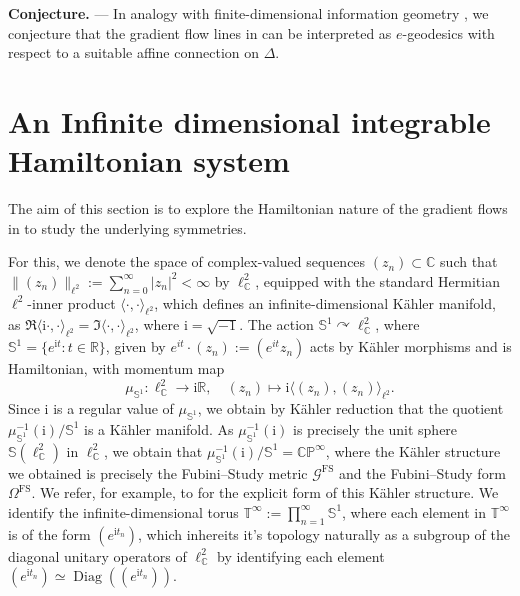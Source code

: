 \documentclass[runningheads]{llncs}
\def\S{\mathbb{S}}
\def\RR{\mathbb{R}}
\def\CC{\mathbb{C}}
\def\i{\mathrm{i}}
\begin{document}
\textbf{Conjecture.} — In analogy with finite-dimensional information geometry \cite{MR1800071,InfGeo_book}, we conjecture that the gradient flow lines in  can be interpreted as $e$-geodesics with respect to a suitable affine connection on \( \Delta \).

\section{An Infinite dimensional integrable Hamiltonian system}\label{S: 4}
The aim of this section is to explore the Hamiltonian nature of the gradient flows in   to study the underlying symmetries.  

For this, we denote the space of complex-valued sequences $(z_n) \subset \mathbb{C}$ such that $\| (z_n)\|_{\ell^2}:=\sum_{n=0}^{\infty} |z_n|^2 < \infty$  
by $\ell_{\mathbb{C}}^2$, equipped with the standard Hermitian $\ell^2$-inner product $\langle \cdot, \cdot \rangle_{\ell^2}$,  
which defines an infinite-dimensional Kähler manifold, as  
$\Re \langle \mathrm{i} \cdot, \cdot \rangle_{\ell^2} = \Im \langle \cdot, \cdot \rangle_{\ell^2}$,  
where $\mathrm{i} = \sqrt{-1}$.
The action $\mathbb{S}^1 \curvearrowright \ell_{\mathbb{C}}^2$, where $\S^1=\{e^{\i t}: t\in \RR\}$,  given by $e^{it} \cdot (z_n) := (e^{it}z_n)$ acts by Kähler morphisms and is Hamiltonian, with momentum map 
\begin{equation} \label{eq:S1_momentmap_cpinf}
	\mu_{\mathbb{S}^1} : \ell^2_{\mathbb{C}} \longrightarrow  \mathrm{i} \mathbb{R}, \quad (z_n) \mapsto \mathrm{i} \langle (z_n), (z_n) \rangle_{\ell^2}.
\end{equation}  
Since $\mathrm{i}$ is a regular value of $\mu_{\mathbb{S}^1}$, we obtain by Kähler reduction that the quotient  
$\mu_{\mathbb{S}^1}^{-1}(\mathrm{i}) / \mathbb{S}^1$ is a Kähler manifold. As $\mu_{\mathbb{S}^1}^{-1}(\mathrm{i})$ is precisely the unit sphere $\mathbb{S}(\ell_{\mathbb{C}}^2)$ in $\ell_{\mathbb{C}}^2$, we obtain that  
$\mu_{\mathbb{S}^1}^{-1}(\mathrm{i}) / \mathbb{S}^1 = \mathbb{CP}^{\infty}$, where the Kähler structure we obtained is precisely the Fubini–Study metric $\mathcal{G}^{\mathrm{FS}}$ and the Fubini–Study form $\Omega^{\mathrm{FS}}$. We refer, for example, to \cite[§2]{khesin_geometry_2019} for the explicit form of this Kähler structure. 
We identify the infinite-dimensional torus $\mathbb{T}^{\infty} := \prod_{n=1}^{\infty} \mathbb{S}^1$, where each element in $\mathbb{T}^{\infty}$ is of the form $(e^{\mathrm{i} t_n})$, which inhereits it's topology naturally  as a subgroup of the diagonal unitary operators of $\ell^2_{\CC}$ by identifying each element $(e^{\mathrm{i} t_n})\simeq \operatorname{Diag}((e^{\mathrm{i} t_n}))$. 
\end{document}
